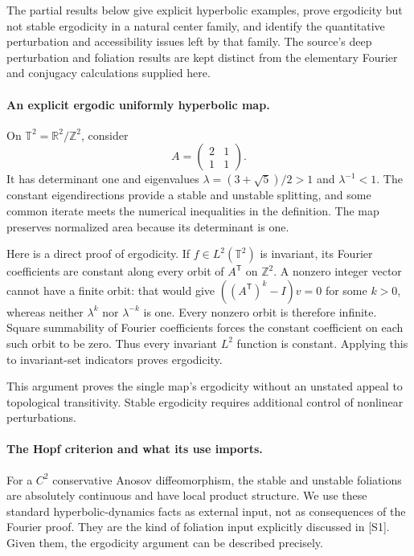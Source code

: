 \documentclass[11pt]{article}
\begin{document}
The partial results below give explicit hyperbolic examples,
prove ergodicity but not stable ergodicity in a natural center
family, and identify the quantitative perturbation and accessibility
issues left by that family. The source's deep perturbation and
foliation results are kept distinct from the elementary Fourier
and conjugacy calculations supplied here.

\paragraph{An explicit ergodic uniformly hyperbolic map.}
On $\mathbb T^2=\mathbb R^2/\mathbb Z^2$, consider
\[
 A=\begin{pmatrix}2&1\\1&1\end{pmatrix}.
\]
It has determinant one and eigenvalues
$\lambda=(3+\sqrt5)/2>1$ and $\lambda^{-1}<1$.
The constant eigendirections provide a stable and unstable
splitting, and some common iterate meets the numerical inequalities
in the definition. The map preserves normalized area because
its determinant is one.

Here is a direct proof of ergodicity. If $f\in L^2(\mathbb T^2)$
is invariant, its Fourier coefficients are constant along every
orbit of $A^{\mathsf T}$ on $\mathbb Z^2$. A nonzero integer
vector cannot have a finite orbit: that would give
$((A^{\mathsf T})^k-I)v=0$ for some $k>0$, whereas neither
$\lambda^k$ nor $\lambda^{-k}$ is one. Every nonzero orbit is
therefore infinite. Square summability of Fourier coefficients
forces the constant coefficient on each such orbit to be zero.
Thus every invariant $L^2$ function is constant. Applying this
to invariant-set indicators proves ergodicity.

This argument proves the single map's ergodicity without an
unstated appeal to topological transitivity. Stable ergodicity
requires additional control of nonlinear perturbations.

\paragraph{The Hopf criterion and what its use imports.}
For a $C^2$ conservative Anosov diffeomorphism, the stable and
unstable foliations are absolutely continuous and have local
product structure. We use these standard hyperbolic-dynamics
facts as external input, not as consequences of the Fourier proof.
They are the kind of foliation input explicitly discussed in
[S1]. Given them, the ergodicity argument can be described precisely.
\end{document}
